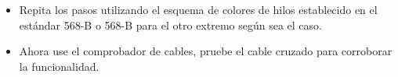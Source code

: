 \documentclass[journal]{IEEEtran}
\begin{document}
\begin{itemize}
	\item Repita los pasos utilizando el esquema de colores de hilos establecido en el estándar 568-B o 568-B para el otro extremo según sea el caso.
	\item Ahora use el comprobador de cables, pruebe el cable cruzado para corroborar la funcionalidad.
	
	

\end{itemize}
\end{document}
